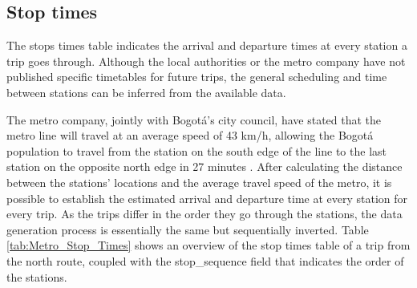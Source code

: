 \documentclass[12pt, a4paper]{report}
\begin{document}
\begin{table}[ht]
\centering
{}
\caption{Metro stops table.}
\label{tab:Metro_Stops}
\end{table}

\subsection{Stop times}

The stops times table indicates the arrival and departure times at every station a trip goes through. Although the local authorities or the metro company have not published specific timetables for future trips, the general scheduling and time between stations can be inferred from the available data.

The metro company, jointly with Bogotá's city council, have stated that the metro line will travel at an average speed of 43 km/h, allowing the Bogotá population to travel from the station on the south edge of the line to the last station on the opposite north edge in 27 minutes \citep{metrodebogotaPrimeraLineaMetro2022}. After calculating the distance between the stations' locations and the average travel speed of the metro, it is possible to establish the estimated arrival and departure time at every station for every trip. As the trips differ in the order they go through the stations, the data generation process is essentially the same but sequentially inverted. Table \ref{tab:Metro_Stop_Times} shows an overview of the stop times table of a trip from the north route, coupled with the stop\_sequence field that indicates the order of the stations.
\end{document}
